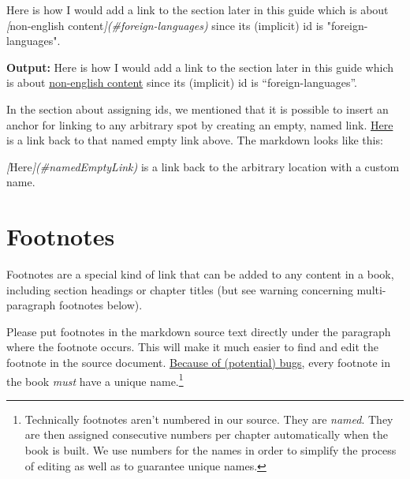 \documentclass[
]{book}
\newenvironment{Shaded}{\begin{snugshade}}{\end{snugshade}}
\newcommand{\CommentTok}[1]{\textcolor[rgb]{0.56,0.35,0.01}{\textit{#1}}}
\newcommand{\NormalTok}[1]{#1}
\newcommand{\OtherTok}[1]{\textcolor[rgb]{0.56,0.35,0.01}{#1}}
\begin{document}
\begin{Shaded}
\begin{Highlighting}[]
\NormalTok{Here is how I would add a link to the section later in this guide which is about }\CommentTok{[}\OtherTok{non{-}english content}\CommentTok{](\#foreign{-}languages)}\NormalTok{ since its (implicit) id is "foreign{-}languages".}
\end{Highlighting}
\end{Shaded}

\textbf{Output:}
Here is how I would add a link to the section later in this guide which is about \protect\hyperlink{foreign-languages}{non-english content} since its (implicit) id is ``foreign-languages''.

In the section about assigning ids, we mentioned that it is possible to insert an anchor for linking to any arbitrary spot by creating an empty, named link. \protect\hyperlink{namedEmptyLink}{Here} is a link back to that named empty link above. The markdown looks like this:

\begin{Shaded}
\begin{Highlighting}[]
\CommentTok{[}\OtherTok{Here}\CommentTok{](\#namedEmptyLink)}\NormalTok{ is a link back to the arbitrary location with a custom name. }
\end{Highlighting}
\end{Shaded}

\hypertarget{footnotes}{%
\section{Footnotes}\label{footnotes}}

Footnotes are a special kind of link that can be added to any content in a book, including section headings or chapter titles (but see warning concerning multi-paragraph footnotes below).

Please put footnotes in the markdown source text directly under the paragraph where the footnote occurs. This will make it much easier to find and edit the footnote in the source document. \href{https://community.rstudio.com/t/how-can-i-enable-the-file-scope-option/83741}{Because of (potential) bugs}, every footnote in the book \emph{must} have a unique name.\footnote{Technically footnotes aren't numbered in our source. They are \emph{named}. They are then assigned consecutive numbers per chapter automatically when the book is built. We use numbers for the names in order to simplify the process of editing as well as to guarantee unique names.}
\end{document}
